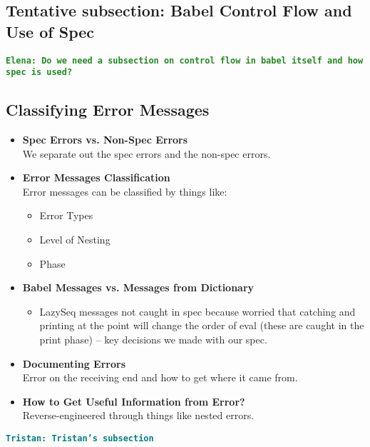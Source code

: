 \documentclass[12pt]{article}
\newcommand{\comment}[1]{{\bf \tt  {#1}}}
\newcommand{\emcomment}[1]{\textcolor{ForestGreen}{\comment{Elena: {#1}}}}
\newcommand{\tkcomment}[1]{\textcolor{Teal}{\comment{Tristan: {#1}}}}
\begin{document}
\subsection{Tentative subsection: Babel Control Flow and Use of Spec}\label{subsec:control-flow}
\emcomment{Do we need a subsection on control flow in babel itself and how spec is used?}

\subsection{Classifying Error Messages}\label{subsec:classification}
\begin{itemize}
    \item \textbf{Spec Errors vs. Non-Spec Errors} \\
    We separate out the spec errors and the non-spec errors.

    \item \textbf{Error Messages Classification} \\
    Error messages can be classified by things like:
    \begin{itemize}
        \item Error Types
        \item Level of Nesting
        \item Phase
    \end{itemize}

    \item \textbf{Babel Messages vs. Messages from Dictionary} \\
    \begin{itemize}
        \item LazySeq messages not caught in spec because worried that catching and printing at the point will change the order of eval (these are caught in the print phase) -- key decisions we made with our spec.
    \end{itemize}

    \item \textbf{Documenting Errors} \\
    Error on the receiving end and how to get where it came from.

    \item \textbf{How to Get Useful Information from Error?} \\
    Reverse-engineered through things like nested errors.

\end{itemize}
\tkcomment{Tristan's subsection}
\end{document}
